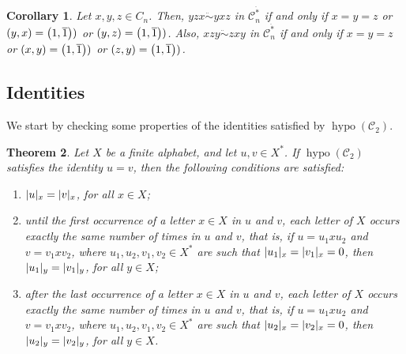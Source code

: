 \documentclass[a4paper,reqno]{amsart}
\numberwithin{equation}{section}
\theoremstyle{plain}
\newtheorem{thm}{Theorem}[section]
\newtheorem{cor}[thm]{Corollary}
\theoremstyle{definition}
\theoremstyle{remark}
\DeclarePairedDelimiter{\parens}{\lparen}{\rparen}
\DeclarePairedDelimiter{\wlng}{\lvert}{\rvert}  %
\newcommand*{\wbar}[1]{\overline{#1}}  %
\newcommand*{\qcrst}[1]{\mathcal{#1}}
\newcommand*{\qctC}{\qcrst{C}}
\newcommand*{\qctCn}{\qctC_n}
\newcommand*{\fqcms}{{\ddot{*}}}      %
\DeclareMathOperator{\hypo}{hypo}
\newcommand*{\hyco}{\mathrel{\ddot{\sim}}}
\begin{document}
\begin{cor}
\label{cor:hypotCnKnuthrel}
Let $x, y, z \in C_n$.
Then, $yzx \hyco yxz$ in $\qctCn^\fqcms$ if and only if $x = y = z$ or $(y, x) = \parens[\big]{ 1, \wbar{1} })$ or $(y, z) = \parens[\big]{ 1, \wbar{1} })$.
Also, $xzy \hyco zxy$ in $\qctCn^\fqcms$ if and only if $x = y = z$ or $(x, y) = \parens[\big]{ 1, \wbar{1} })$ or $(z, y) = \parens[\big]{ 1, \wbar{1} })$.
\end{cor}





\subsection{Identities}
\label{subsec:hypotCnident}

We start by checking some properties of the identities satisfied by $\hypo (\qctC_2)$.

\begin{thm}
\label{thm:hypotC2identproperties}
Let $X$ be a finite alphabet, and let $u, v \in X^*$.
If $\hypo (\qctC_2)$ satisfies the identity $u = v$, then the following conditions are satisfied:
\begin{enumerate}
\item\label{thm:hypotC2identpropertiesletters}
$\wlng{u}_x = \wlng{v}_x$, for all $x \in X$;

\item\label{thm:hypotC2identpropertiesfirst}
until the first occurrence of a letter $x \in X$ in $u$ and $v$, each letter of $X$ occurs exactly the same number of times in $u$ and $v$, that is, if $u = u_1 x u_2$ and $v = v_1 x v_2$, where $u_1, u_2, v_1, v_2 \in X^*$ are such that $\wlng{u_1}_x = \wlng{v_1}_x = 0$, then $\wlng{u_1}_y = \wlng{v_1}_y$, for all $y \in X$;

\item\label{thm:hypotC2identpropertieslast}
after the last occurrence of a letter $x \in X$ in $u$ and $v$, each letter of $X$ occurs exactly the same number of times in $u$ and $v$, that is, if $u = u_1 x u_2$ and $v = v_1 x v_2$, where $u_1, u_2, v_1, v_2 \in X^*$ are such that $\wlng{u_2}_x = \wlng{v_2}_x = 0$, then $\wlng{u_2}_y = \wlng{v_2}_y$, for all $y \in X$.
\end{enumerate}
\end{thm}
\end{document}
